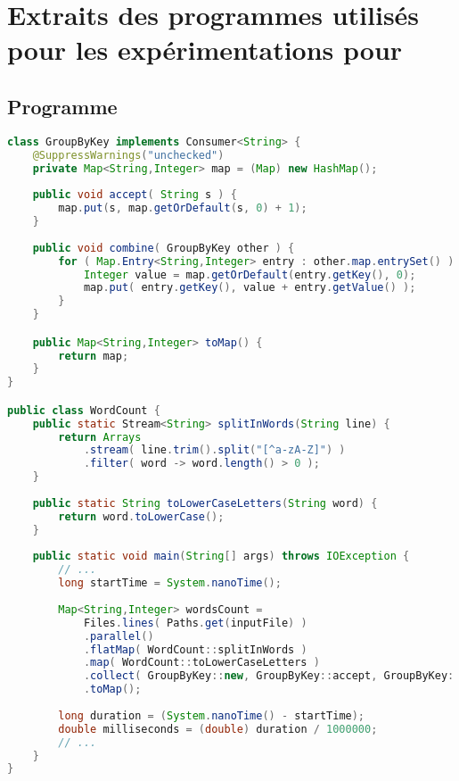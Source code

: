 \chapter{Extraits des programmes utilisés pour les expérimentations pour }
\label{appendice-code-wordcount.ann}

\section{Programme }

\begin{lstlisting}[basicstyle=\ttfamily\footnotesize,language=java]
class GroupByKey implements Consumer<String> {
    @SuppressWarnings("unchecked")
    private Map<String,Integer> map = (Map) new HashMap();
    
    public void accept( String s ) {
        map.put(s, map.getOrDefault(s, 0) + 1);
    }
    
    public void combine( GroupByKey other ) {
        for ( Map.Entry<String,Integer> entry : other.map.entrySet() ) {
            Integer value = map.getOrDefault(entry.getKey(), 0);
            map.put( entry.getKey(), value + entry.getValue() );
        } 
    }

    public Map<String,Integer> toMap() {
        return map;
    }
}

public class WordCount {
    public static Stream<String> splitInWords(String line) {
        return Arrays
            .stream( line.trim().split("[^a-zA-Z]") )
            .filter( word -> word.length() > 0 );
    }
    
    public static String toLowerCaseLetters(String word) {
        return word.toLowerCase();
    }
    
    public static void main(String[] args) throws IOException {
        // ...
        long startTime = System.nanoTime();
        
        Map<String,Integer> wordsCount = 
            Files.lines( Paths.get(inputFile) )
            .parallel()
            .flatMap( WordCount::splitInWords )
            .map( WordCount::toLowerCaseLetters )
            .collect( GroupByKey::new, GroupByKey::accept, GroupByKey::combine )
            .toMap();
        
        long duration = (System.nanoTime() - startTime);
        double milliseconds = (double) duration / 1000000;
        // ...
    }
}        
\end{lstlisting}


